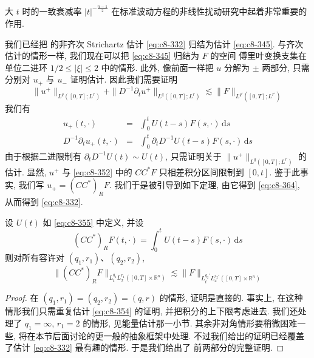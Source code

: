大 $t$ 时的一致衰减率 $|t|^{-\frac{n-1}{2}}$ 在标准波动方程的非线性扰动研究中起着非常重要的作用. 


我们已经把 的非齐次 Strichartz 估计 \eqref{eq:c8-332} 归结为估计 \eqref{eq:c8-345}. 与齐次估计的情形一样, 我们现在可以把 \eqref{eq:c8-345} 归结为 $F$ 的空间 傅里叶变换支集在单位二进环 $1/2\leq|\xi|\leq2$ 中的情形. 此外, 像前面一样把 $u$ 分解为 $\pm$ 两部分, 只需分别对 $u_{+}$ 与 $u_{-}$ 证明估计. 因此我们需要证明
\begin{equation}
\|u^{+}\|_{L^q([0, T];L^r)}+\|D^{-1}\partial_t u^{+}\|_{L^q([0, T];L^r)}\lesssim\|F\|_{L^{q'}([0, T];L^{r'})}\label{eq:c8-364}
\end{equation}
我们有
\[
\begin{array}{rcl}
u_{+}(t, \cdot) & = & \displaystyle\int_0^t U(t-s)F(s, \cdot)\, \mathrm{d}s\\[6pt]
D^{-1}\partial_t u_{+}(t, \cdot) & = & \displaystyle\int_0^t \partial_t D^{-1}U(t-s)F(s, \cdot)\, \mathrm{d}s
\end{array}
\]
由于根据二进限制有 $\partial_t D^{-1}U(t)\sim U(t)$, 只需证明关于 $\|u^{+}\|_{L^q([0, T];L^r)}$ 的估计. 显然, $u^{+}$ 与 \eqref{eq:c8-352} 中的 $CC^{*}F$ 只相差积分区间限制到 $[0, t]$. 鉴于此事实, 我们写 $u_{+}=(CC^{*})_R F$. 我们于是被引导到如下定理, 由它得到 \eqref{eq:c8-364}, 从而得到 \eqref{eq:c8-332}. 

\begin{theorem}\label{thm:c8-0.45}
设 $U(t)$ 如 \eqref{eq:c8-355} 中定义, 并设
\[
(CC^{*})_R F(t, \cdot)=\int_0^t U(t-s)F(s, \cdot)\, \mathrm{d}s
\]
则对所有容许对 $(q_1, r_1)$、$(q_2, r_2)$, 
\begin{equation}
\|(CC^{*})_R F\|_{L_t^{q_1} L_x^{r_1}([0, T]\times\mathbb{R}^n)}\lesssim\|F\|_{L_t^{q_2'} L_x^{r_2'}([0, T]\times\mathbb{R}^n)}\label{eq:c8-365}
\end{equation}
\end{theorem}

\begin{proof}
在 $(q_1, r_1)=(q_2, r_2)=(q, r)$ 的情形, 证明是直接的. 事实上, 在这种情形我们只需重复估计 \eqref{eq:c8-354} 的证明, 并把积分的上下限考虑进去. 我们还处理了 $q_1=\infty$, $r_1=2$ 的情形, 见能量估计那一小节. 其余非对角情形要稍微困难一些, 将在本节后面讨论的更一般的抽象框架中处理. 不过我们给出的证明已经覆盖了估计 \eqref{eq:c8-332} 最有趣的情形. 于是我们给出了 前两部分的完整证明. 
\end{proof}

